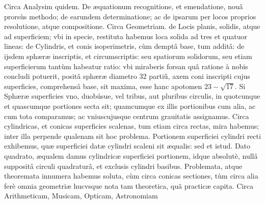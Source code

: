 \documentclass[11pt,a4paper]{article}
\begin{document}
Circa Analysim quidem. De æquationum recognitione, et emendatione, nouâ prorsùs methodo; de earundem determinatione; ac de ipsarum per locos proprios resolutione, atque compositione. Circa Geometriam. de Locis planis, solidis, atque ad superficiem; vbi in specie, restituta habemus loca solida ad tres et quatuor lineas: de Cylindris, et conis isoperimetris, cùm demptâ base, tum additâ: de ijsdem sphæræ inscriptis, et circumscriptis: seu spatiorum solidorum, seu etiam superficierum tantùm habeatur ratio: vbi miraberis forsan quâ ratione à nobis concludi potuerit, positâ sphæræ diametro 32 partiũ, axem coni inscripti cujus superficies, comprehensâ base, sit maxima, esse hanc apotomen $23 - \sqrt{17}$. Si Sphæræ superficies vno, duobúsue, vel tribus, aut pluribus circulis, in quotcunque et quascumque portiones secta sit; quamcumque ex illis portionibus cum alia, ac cum tota comparamus; ac vniuscujusque centrum grauitatis assignamus. Circa cylindricas, et conicas superficies scalenas, tum etiam circa rectas, mira habemus; inter illa perpende qualenam sit hoc problema. Portionem superficiei cylindri recti exhibemus, quæ superficiei datæ cylindri scaleni sit æqualis: sed et istud. Dato quadrato, æqualem damus cylindricæ superficiei portionem, idque absolutè, nullâ suppositâ circuli quadraturâ, et exclusis cylindri basibus. Problemata, atque theoremata innumera habemus soluta, cùm circa conicas sectiones, tùm circa alia ferè omnia geometriæ hucvsque nota tam theoretica, quã practicæ capita. Circa Arithmeticam, Musicam, Opticam, Astronomiam
\end{document}
